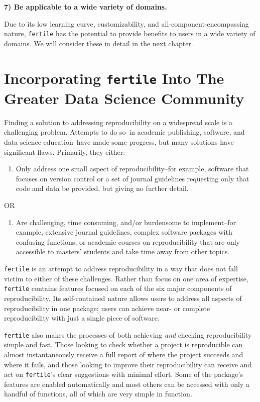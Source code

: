 \documentclass[12pt,twoside]{reedthesis}
\providecommand{\tightlist}{%
  \setlength{\itemsep}{0pt}\setlength{\parskip}{0pt}}
\begin{document}
\textbf{7) Be applicable to a wide variety of domains.}

Due to its low learning curve, customizability, and all-component-encompassing nature, \texttt{fertile} has the potential to provide benefits to users in a wide variety of domains. We will consider these in detail in the next chapter.

\hypertarget{applications}{%
\chapter{\texorpdfstring{Incorporating \texttt{fertile} Into The Greater Data Science Community}{Incorporating fertile Into The Greater Data Science Community}}\label{applications}}

Finding a solution to addressing reproducibility on a widespread scale is a challenging problem. Attempts to do so--in academic publishing, software, and data science education--have made some progress, but many solutions have significant flaws. Primarily, they either:
\begin{enumerate}
\def\labelenumi{\Alph{enumi})}
\tightlist
\item
  Only address one small aspect of reproducibility--for example, software that focuses on version control or a set of journal guidelines requesting only that code and data be provided, but giving no further detail.
\end{enumerate}
\begin{center}
OR
\end{center}
\begin{enumerate}
\def\labelenumi{\Alph{enumi})}
\setcounter{enumi}{1}
\tightlist
\item
  Are challenging, time consuming, and/or burdensome to implement--for example, extensive journal guidelines, complex software packages with confusing functions, or academic courses on reproducibility that are only accessible to masters' students and take time away from other topics.
\end{enumerate}
\texttt{fertile} is an attempt to address reproducibility in a way that does not fall victim to either of these challenges. Rather than focus on one area of expertise, \texttt{fertile} contains features focused on each of the six major components of reproducibility. Its self-contained nature allows users to address all aspects of reproducibility in one package; users can achieve near- or complete reproducibility with just a single piece of software.

\texttt{fertile} also makes the processes of both achieving \emph{and} checking reproducibility simple and fast. Those looking to check whether a project is reproducible can almost instantaneously receive a full report of where the project succeeds and where it fails, and those looking to improve their reproducibility can receive and act on \texttt{fertile}'s clear suggestions with minimal effort. Some of the package's features are enabled automatically and most others can be accessed with only a handful of functions, all of which are very simple in function.
\end{document}
